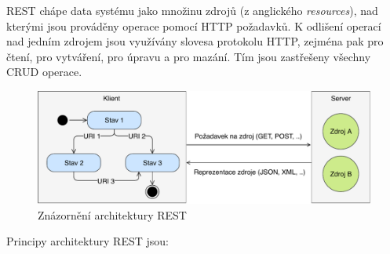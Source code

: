 \gls{REST} chápe data systému jako množinu zdrojů (z anglického \textit{resources}),
nad kterými jsou prováděny operace pomocí \gls{HTTP} požadavků. K odlišení operací
nad jedním zdrojem jsou využívány slovesa protokolu \gls{HTTP}, zejména pak  pro čtení,
 pro vytváření,  pro úpravu a  pro mazání. Tím jsou zastřešeny
všechny \gls{CRUD} operace.

\begin{figure}[t]
    \centering
    \includegraphics[keepaspectratio=true, width=0.9\linewidth]{figures/rest-statelessness.pdf}
    \caption{Znázornění architektury \gls{REST}}
    \label{fig:rest-statelessness}
\end{figure}

Principy architektury \gls{REST} jsou:

